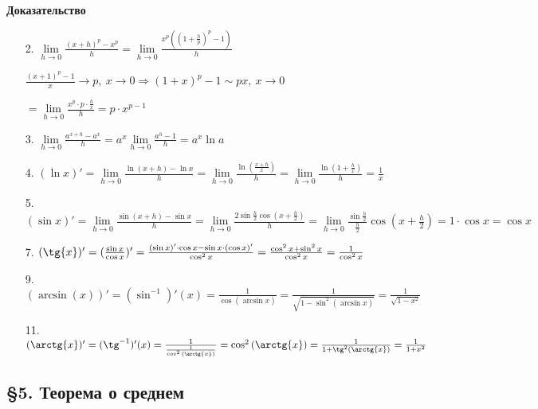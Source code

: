 \documentclass[14pt, letter paper]{article}
\begin{document}
\begin{center}
    \textbf{Доказательство}
\end{center}

\begin{enumerate}
    \item[2.] $\lim\limits_{h \rightarrow 0} \frac{(x + h)^p - x^p}{h} = \lim\limits_{h \rightarrow 0} \frac{x^p((1 + \frac{h}{p})^p - 1)}{h}$
    
    $\frac{(x + 1)^p - 1}{x} \rightarrow p,\ x \rightarrow 0 \Rightarrow (1 + x)^p - 1 \sim px,\ x \rightarrow 0$

    $= \lim\limits_{h \rightarrow 0} \frac{x^p \cdot p \cdot \frac{h}{x}}{h} = p \cdot x^{p-1}$

    \item[3.] $\lim\limits_{h \rightarrow 0} \frac{a^{x + h} - a^x}{h} = a^x \lim\limits_{h \rightarrow 0} \frac{a^h - 1}{h} = a^x \ln{a}$
    
    \item[4.] $(\ln{x})' = \lim\limits_{h \rightarrow 0} \frac{\ln{(x + h)} - \ln{x}}{h} = \lim\limits_{h \rightarrow 0} \frac{\ln{(\frac{x + h}{x})}}{h} = \lim\limits_{h \rightarrow 0} \frac{\ln{(1 + \frac{h}{x})}}{h} = \frac{1}{x}$
    
    \item[5.] $(\sin{x})' = \lim\limits_{h \rightarrow 0} \frac{\sin{(x + h)} - \sin{x}}{h} = \lim\limits_{h \rightarrow 0} \frac{2 \sin{\frac{h}{2}} \cos{(x + \frac{h}{2})}}{h} = \lim\limits_{h \rightarrow 0} \frac{\sin{\frac{h}{2}}}{\frac{h}{2}} \cos{(x + \frac{h}{2})} = 1 \cdot \cos{x} = \cos{x}$
    
    \item[7.] $(\tg{x})' = (\frac{\sin{x}}{\cos{x}})' = \frac{(\sin{x})' \cdot \cos{x} - \sin{x} \cdot (\cos{x})'}{\cos^2{x}} = \frac{\cos^2{x} + \sin^2{x}}{\cos^2{x}} = \frac{1}{\cos^2{x}}$
    
    \item[9.] $(\arcsin(x))' = (\sin^{-1})'(x) = \frac{1}{\cos{(\arcsin{x})}} = \frac{1}{\sqrt{1 - \sin^2{(\arcsin{x})}}} = \frac{1}{\sqrt{1 - x^2}}$
    
    \item[11.] $(\arctg{x})' = (\tg^{-1})'(x) = \frac{1}{\frac{1}{\cos^2{(\arctg{x})}}} = \cos^2{(\arctg{x})} = \frac{1}{1 + \tg^2{(\arctg{x})}} = \frac{1}{1 + x^2}$
\end{enumerate}

\begin{center}
    \subsection*{\S 5. Теорема о среднем}
\end{center}
\end{document}
